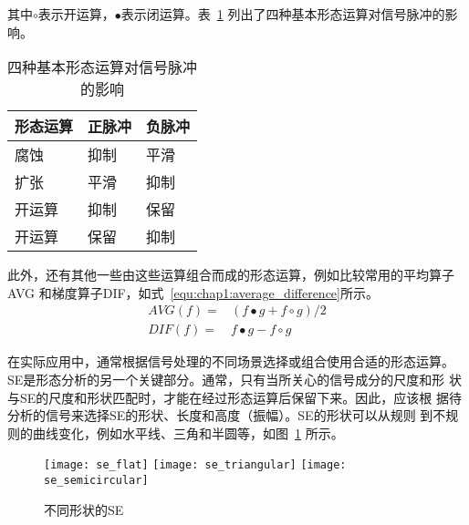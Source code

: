 其中$\circ$表示开运算，$\bullet$表示闭运算。表~\ref{tab:morphological_operator_effect}
列出了四种基本形态运算对信号脉冲的影响。
\begin{table}[htb]
  \centering
  \begin{minipage}[t]{0.6\linewidth}
  \caption{四种基本形态运算对信号脉冲的影响}
  \label{tab:morphological_operator_effect}
    \begin{tabularx}{\linewidth}{XXX}
      \toprule[1.5pt]
      形态运算 & 正脉冲 & 负脉冲 \\\midrule[1pt]
      腐蚀 & 抑制 & 平滑 \\
      扩张 & 平滑 & 抑制 \\
      开运算 & 抑制 & 保留 \\
      开运算 & 保留 & 抑制 \\
      \bottomrule[1.5pt]
    \end{tabularx}
  \end{minipage}
\end{table}

此外，还有其他一些由这些运算组合而成的形态运算，例如比较常用的平均算子AVG
和梯度算子DIF，如式~\ref{equ:chap1:average_difference}所示。
\begin{equation}
  \label{equ:chap1:average_difference}
  \begin{aligned}
    AVG(f) = & (f\bullet g + f\circ g)/2 \\
    DIF(f) = & f\bullet g - f\circ g 
  \end{aligned}
\end{equation}

在实际应用中，通常根据信号处理的不同场景选择或组合使用合适的形态运算。
SE是形态分析的另一个关键部分。通常，只有当所关心的信号成分的尺度和形
状与SE的尺度和形状匹配时，才能在经过形态运算后保留下来。因此，应该根
据待分析的信号来选择SE的形状、长度和高度（振幅）。SE的形状可以从规则
到不规则的曲线变化，例如水平线、三角和半圆等，如图~\ref{fig:se_shape}
所示。
\begin{figure}[ht]
  \centering
  {\texttt{[image: se\_flat]}}
  \hspace{4em}
  {\texttt{[image: se\_triangular]}}
  \hspace{4em}
  {\texttt{[image: se\_semicircular]}}
  \caption{不同形状的SE}
  \label{fig:se_shape}
\end{figure}

